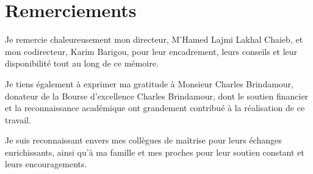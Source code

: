 \section*{Remerciements}
Je remercie chaleureusement mon directeur, M’Hamed Lajmi Lakhal Chaieb, et mon codirecteur, Karim Barigou, pour leur encadrement, leurs conseils et leur disponibilité tout au long de ce mémoire.

Je tiens également à exprimer ma gratitude à Monsieur Charles Brindamour, donateur de la Bourse d’excellence Charles Brindamour, dont le soutien financier et la reconnaissance académique ont grandement contribué à la réalisation de ce travail.

Je suis reconnaissant envers mes collègues de maîtrise pour leurs échanges enrichissants, ainsi qu’à ma famille et mes proches pour leur soutien constant et leurs encouragements.